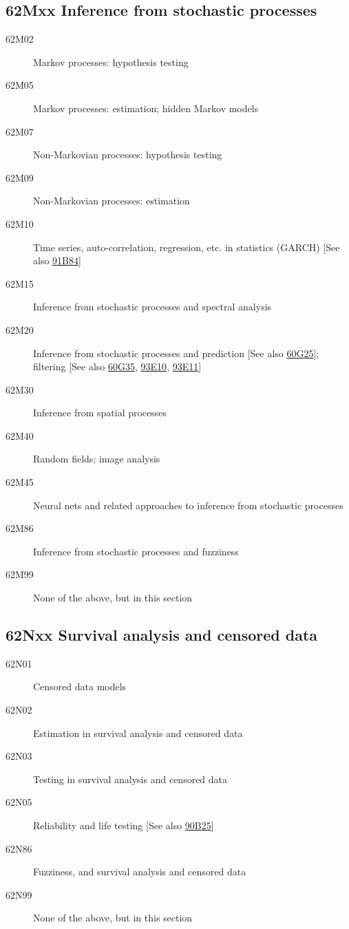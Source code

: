 \subsection*{62Mxx  Inference from stochastic processes }\label{62Mxx}
\begin{description}  
\item [62M02]\label{62M02} Markov processes: hypothesis testing
\item [62M05]\label{62M05} Markov processes: estimation; hidden Markov models
\item [62M07]\label{62M07} Non-Markovian processes: hypothesis testing
\item [62M09]\label{62M09} Non-Markovian processes: estimation
\item [62M10]\label{62M10} Time series, auto-correlation, regression, etc. in statistics (GARCH) [See also \hyperref[91B84]{91B84}]
\item [62M15]\label{62M15} Inference from stochastic processes and spectral analysis 
\item [62M20]\label{62M20} Inference from stochastic processes and prediction [See also \hyperref[60G25]{60G25}]; filtering [See also \hyperref[60G35]{60G35}, \hyperref[93E10]{93E10}, \hyperref[93E11]{93E11}]
\item [62M30]\label{62M30} Inference from spatial processes
\item [62M40]\label{62M40} Random fields; image analysis
\item [62M45]\label{62M45} Neural nets and related approaches to inference from stochastic processes
\item [62M86]\label{62M86} Inference from stochastic processes and fuzziness
\item [62M99]\label{62M99} None of the above, but in this section
\end{description}
\subsection*{62Nxx  Survival analysis and censored data }\label{62Nxx}
\begin{description}  
\item [62N01]\label{62N01} Censored data models
\item [62N02]\label{62N02} Estimation in survival analysis and censored data
\item [62N03]\label{62N03} Testing in survival analysis and censored data
\item [62N05]\label{62N05} Reliability and life testing [See also \hyperref[90B25]{90B25}]
\item [62N86]\label{62N86} Fuzziness, and survival analysis and censored data
\item [62N99]\label{62N99} None of the above, but in this section
\end{description}
